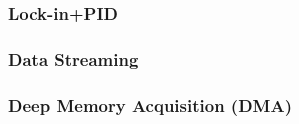 \subsubsection{Lock-in+PID}


\subsubsection{Data Streaming}


\subsubsection{Deep Memory Acquisition (DMA)}
